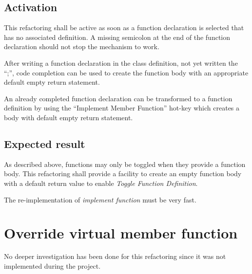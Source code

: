 \subsection{Activation}
This refactoring shall be active as soon as a function declaration is selected 
that has no associated definition. A missing semicolon at the end of the 
function declaration should not stop the mechanism to work.

After writing a function declaration in the class definition, not yet written
the ``;'', code completion can be used to create the function body with an
appropriate default empty return statement.\newline

An already completed function declaration can be transformed to a function
definition by using the ``Implement Member Function'' hot-key which creates a
body with default empty return statement.

\subsection{Expected result}
As described above, functions may only be toggled when they provide a function 
body. This refactoring shall provide a facility to create an empty function body 
with a default return value to enable \textit{Toggle Function Definition}.

The re-implementation of \textit{implement function} must be very fast. 

\section{Override virtual member function}

No deeper investigation has been done for this refactoring since it was not 
implemented during the project.

